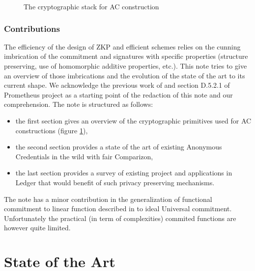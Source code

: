 \documentclass[11pt]{llncs2e/llncs}
\begin{document}
\begin{figure}
 \begin{center} 

 \caption{The cryptographic stack for AC construction}
 \label{fig-cryptostack}
 \end{center}
 \end{figure} 
 
\subsubsection{Contributions}
The efficiency of the design of ZKP and efficient schemes relies on the cunning imbrication of the commitment and signatures with specific properties (structure preserving, use of homomorphic additive properties, etc.). This note tries to give an overview of those imbrications and the evolution of the state of the art to its current shape. We acknowledge the previous work of   \cite{PrimforW3} and  section D.5.2.1 of Prometheus project \cite{Prom} as a starting point of the redaction  of this note and our comprehension. The note is structured as follows:
\begin{itemize}
 \item the first section gives an overview of the cryptographic primitives used for AC constructions (figure \ref{fig-cryptostack}),
 \item the second section provides a state of the art of existing Anonymous Credentials in the wild with fair Comparizon,
 \item the last section provides a survey of existing project and applications in \textregistered Ledger that would benefit of such privacy preserving mechanisms.
\end{itemize}
The note has a minor contribution in the generalization of functional commitment to linear function described in \cite{Libert16} to ideal Universal commitment. Unfortunately the practical (in term of complexities) commited functions are however quite limited.
 
\section{State of the Art}
\end{document}
